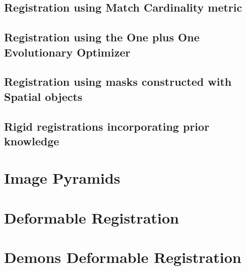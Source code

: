 \subsection{Registration using Match Cardinality metric}
\label{sec:RegistrationMatchCardinality}
\ifitkFullVersion

\fi


\subsection{Registration using the One plus One Evolutionary Optimizer}
\label{sec:RegistrationOnePlusOne}
\ifitkFullVersion

\fi



\subsection{Registration using masks constructed with Spatial objects}
\label{sec:RegistrationSpatialObjects}
\ifitkFullVersion

\fi



\subsection{Rigid registrations incorporating prior knowledge}
\label{sec:RegistrationCentered2DTransform}
\ifitkFullVersion

\fi


\clearpage


\section{Image Pyramids}
\label{sec:ImagePyramids}
\ifitkFullVersion

\fi


\clearpage

\section{Deformable Registration}
\label{sec:DeformableRegistration}
\ifitkFullVersion

\fi

\clearpage

\section{Demons Deformable Registration}
\label{sec:DemonsDeformableRegistration}
\ifitkFullVersion

\fi

